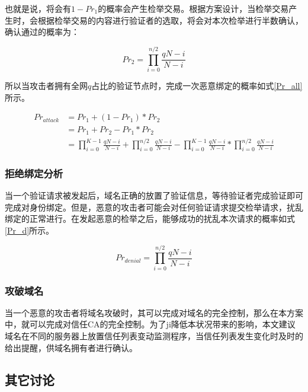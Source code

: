 也就是说，将会有$1-Pr_1$的概率会产生检举交易。根据方案设计，当检举交易产生时，会根据检举交易的内容进行验证者的选取，将会对本次检举进行半数确认，确认通过的概率为：

\begin{equation}\label{Pr_2}
Pr_2 = \prod_{i=0}^{n/2}\frac{qN-i}{N-i}
\end{equation}

所以当攻击者拥有全网$q$占比的验证节点时，完成一次恶意绑定的概率如式\ref{Pr_all}所示。

\begin{equation}
\begin{aligned}
\label{Pr_all}  Pr_{attack} &= Pr_1 + (1-Pr_1) * Pr_2 \\
							&= Pr_1 + Pr_2 - Pr_1 * Pr_2 \\
             				&= \prod_{i=0}^{K-1}\frac{qN-i}{N-i} + \prod_{i=0}^{n/2}\frac{qN-i}{N-i} - \prod_{i=0}^{K-1}\frac{qN-i}{N-i} * \prod_{i=0}^{n/2}\frac{qN-i}{N-i} 
\end{aligned}
\end{equation}




\subsubsection{拒绝绑定分析}

当一个验证请求被发起后，域名正确的放置了验证信息，等待验证者完成验证即可完成对身份绑定。但是，恶意的攻击者可能会对任何验证请求提交检举请求，扰乱绑定的正常进行。在发起恶意的检举之后，能够成功的扰乱本次请求的概率如式\ref{Pr_d}所示。

\begin{equation}\label{Pr_d}
Pr_{denial} = \prod_{i=0}^{n/2}\frac{qN-i}{N-i}
\end{equation}

\subsubsection{攻破域名}

当一个恶意的攻击者将域名攻破时，其可以完成对域名的完全控制，那么在本方案中，就可以完成对信任CA的完全控制。为了ji降低本状况带来的影响，本文建议域名在不同的服务器上放置信任列表变动监测程序，当信任列表发生变化时及时的给出提醒，供域名拥有者进行确认。





\subsection{其它讨论}

